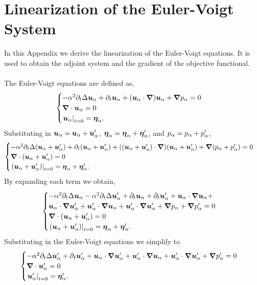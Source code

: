 \chapter{Linearization of the Euler-Voigt System}
\label{app:lin:euler}

In this Appendix we derive the linearization of the Euler-Voigt equations. It is used to obtain the adjoint system and the gradient of the objective functional.
\\~\\
\noindent The Euler-Voigt equations are defined as,
\begin{equation*}
\begin{cases}
      -\alpha^2\partial_t\Delta \ua + \partial_t \ua + (\ua\cdot\bn)\ua+\bn \pa = 0\\
      \bn\cdot \ua = 0\\
      \left.\ua\right\vert_{t=0} = \bea.\\
    \end{cases}
\end{equation*}
Substituting in $\ua=\ua+\upa$, $\bea=\bea+\bepa$, and $\pa=\pa+\ppa$,
$$\begin{cases}
      -\alpha^2\partial_t\Delta (\ua+\upa) + \partial_t (\ua+\upa) + ((\ua+\upa)\cdot\bn)(\ua+\upa)+\bn (\pa+\ppa) = 0\\
      \bn\cdot (\ua+\upa) = 0\\
      \left.(\ua+\upa)\right\vert_{t=0} = \bea+\bepa.\\
    \end{cases}$$
By expanding each term we obtain,
$$\begin{cases}
      -\alpha^2\partial_t\Delta \ua-\alpha^2\partial_t\Delta \upa + \partial_t \ua+\partial_t\upa + \ua\cdot\bn \ua + \\ \ua\cdot\bn \upa +\upa\cdot\bn \ua + \upa\cdot\bn \upa +\bn \pa+ \bn \ppa = 0\\
      \bn\cdot (\ua+\upa) = 0\\
      \left.(\ua+\upa)\right\vert_{t=0} = \bea+\bepa.\\
    \end{cases}$$
Substituting in the Euler-Voigt equations we simplify to
$$\begin{cases}
      -\alpha^2\partial_t\Delta \upa + \partial_t\upa + \ua\cdot\bn \upa +\upa\cdot\bn \ua + \upa\cdot\bn \upa + \bn \ppa = 0\\
      \bn\cdot \upa = 0\\
      \left.\upa\right\vert_{t=0} = \bepa.\\
    \end{cases}$$
